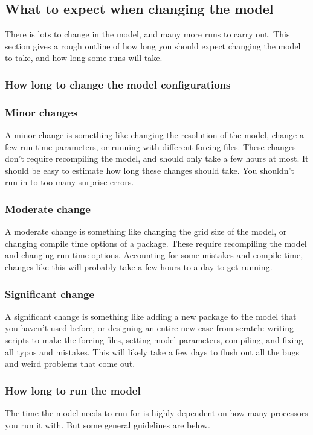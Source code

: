 \documentclass[11pt]{article}
\begin{document}
\subsection{What to expect when changing the model}
There is lots to change in the model, and many more runs to carry out. This section gives a rough outline of how long you should expect changing the model to take, and how long some runs will take.

\subsubsection{How long to change the model configurations}

\subsubsection*{Minor changes}
A minor change is something like changing the resolution of the model, change a few run time parameters, or running with different forcing files. These changes don't require recompiling the model, and should only take a few hours at most. It should be easy to estimate how long these changes should take. You shouldn't run in to too many surprise errors.

\subsubsection*{Moderate change}
A moderate change is something like changing the grid size of the model, or changing compile time options of a package. These require recompiling the model and changing run time options. Accounting for some mistakes and compile time, changes like this will probably take a few hours to a day to get running.

\subsubsection*{Significant change}
A significant change is something like adding a new package to the model that you haven't used before, or designing an entire new case from scratch: writing scripts to make the forcing files, setting model parameters, compiling, and fixing all typos and mistakes. This will likely take a few days to flush out all the bugs and weird problems that come out.

\subsubsection{How long to run the model}
The time the model needs to run for is highly dependent on how many processors you run it with. But some general guidelines are below.
\end{document}
